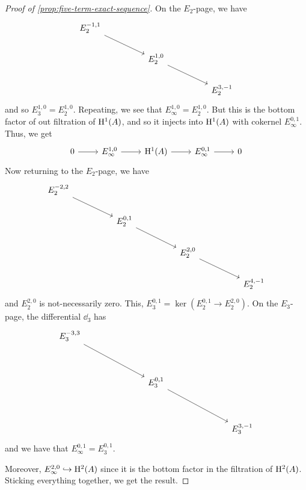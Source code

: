 \documentclass{article}
\begin{document}
\begin{proof}
    [Proof of \cref{prop:five-term-exact-sequence}] On the \(E_2\)-page, we have
    \[\begin{tikzcd}
        {E_2^{-1,1}} \\
        && {E_2^{1,0}} \\
        &&&& {E_2^{3,-1}}
        \arrow[from=1-1, to=2-3]
        \arrow[from=2-3, to=3-5]
    \end{tikzcd}\]
    and so \(E_3^{1, 0} = E_2^{1, 0}\). Repeating, we see that \(E_\infty^{1, 0} = E_2^{1, 0}\). But this is the bottom factor of out filtration of \(\mathrm{H}^1(A)\), and so it injects into \(\mathrm{H}^1(A)\) with cokernel \(E_\infty^{0, 1}\). Thus, we get
    \[\begin{tikzcd}
        0 & {E_\infty^{1,0}} & {\HH^1(A)} & {E_{\infty}^{0,1}} & 0
        \arrow[from=1-1, to=1-2]
        \arrow[from=1-2, to=1-3]
        \arrow[from=1-3, to=1-4]
        \arrow[from=1-4, to=1-5]
    \end{tikzcd}\]
    Now returning to the \(E_2\)-page, we have
    \[\begin{tikzcd}
        {E_2^{-2,2}} \\
        && {E_2^{0,1}} \\
        &&&& {E_2^{2,0}} \\
        &&&&&& {E_2^{4,-1}}
        \arrow[from=1-1, to=2-3]
        \arrow[from=2-3, to=3-5]
        \arrow[from=3-5, to=4-7]
    \end{tikzcd}\]
    and \(E_2^{2, 0}\) is not-necessarily zero. This, \(E_3^{0, 1} = \ker(E_2^{0, 1} \to E_2^{2, 0})\). On the \(E_3\)-page, the differential \(\dd_3\) has
    \[\begin{tikzcd}
        {E_3^{-3,3}} \\
        \\
        &&& {E_3^{0,1}} \\
        \\
        &&&&&& {E_3^{3,-1}}
        \arrow[from=1-1, to=3-4]
        \arrow[from=3-4, to=5-7]
    \end{tikzcd}\]
    and we have that \(E_\infty^{0,1} = E_3^{0, 1}\).

\lec

    Moreover, \(E_\infty^{2, 0} \hookrightarrow \mathrm{H}^2(A)\) since it is the bottom factor in the filtration of \(\mathrm{H}^2(A)\). Sticking everything together, we get the result.
\end{proof}
\end{document}
